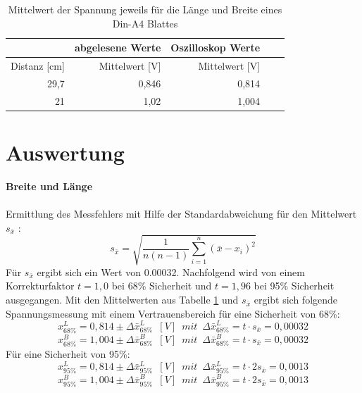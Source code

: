 \documentclass[12pt,oneside,a4paper]{report}
\begin{document}
\begin{table}[H]
\begin{tabular}{|r||r|r|r|r|}
\hline 
  & abgelesene Werte & Oszilloskop Werte \\ 
\hline 
Distanz [cm] & Mittelwert [V] & Mittelwert [V] \\ 
\hline 
 29,7 & 0,846 & 0,814\\ 
\hline
 21 & 1,02 & 1,004 \\ 
\hline 
\end{tabular} 
\caption{Mittelwert der Spannung jeweils für die Länge und Breite eines Din-A4 Blattes}
\label{tab:Aufg3Tabelle}
\end{table}

\section{Auswertung}
\label{chap:VERSUCH_3_AUSWERTUNG}
\textbf{Breite und Länge}
\paragraph{} Ermittlung des Messfehlers mit Hilfe der Standardabweichung für den Mittelwert $ s_{\bar{x}} $ :
\begin{equation}\label{eq:Standardabw_Mittelwert}
s_{\bar{x}} = \sqrt{\dfrac{1}{n(n-1)}\sum_{i=1}^n(\bar{x}-x_{i})^2}
\end{equation}
Für $ s_{\bar{x}} $ ergibt sich ein Wert von 0.00032. 
Nachfolgend wird von einem Korrekturfaktor $ t = 1,0 $ bei 68\% Sicherheit und $ t = 1,96 $ bei 95\% Sicherheit ausgegangen.
Mit den Mittelwerten aus Tabelle \ref{tab:Aufg3Tabelle} und $ s_{\bar{x}} $ ergibt sich folgende Spannungsmessung mit einem Vertrauensbereich für eine Sicherheit von 68\%:
\begin{equation}\label{eq:Messergebnis68L}
x_{68\%}^{L} = 0,814 \pm \Delta\bar{x}_{68\%}^{L} \enspace [V] \enspace mit \enspace \Delta\bar{x}_{68\%}^{L} = t \cdot s_{\bar{x}} = 0,00032
\end{equation}
\begin{equation}\label{eq:Messergebnis68B}
x_{68\%}^{B} = 1,004 \pm \Delta\bar{x}_{68\%}^{B} \enspace [V] \enspace mit \enspace \Delta\bar{x}_{68\%}^{B} = t \cdot s_{\bar{x}} = 0,00032
\end{equation}
Für eine Sicherheit von 95\%:
\begin{equation}\label{eq:Messergebnis95L}
x_{95\%}^{L} = 0,814 \pm \Delta\bar{x}_{95\%}^{L} \enspace [V]  \enspace mit \enspace \Delta\bar{x}_{95\%}^{L} = t \cdot 2s_{\bar{x}} = 0,0013
\end{equation}
\begin{equation}\label{eq:Messergebnis95B}
x_{95\%}^{B} = 1,004 \pm \Delta\bar{x}_{95\%}^{B} \enspace [V]  \enspace mit \enspace \Delta\bar{x}_{95\%}^{B} = t \cdot 2s_{\bar{x}} = 0,0013
\end{equation}
\end{document}

